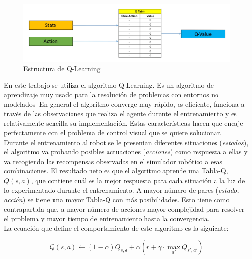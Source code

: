 \begin{figure}[!ht]
    \centering \includegraphics[width=0.8\columnwidth]{./figures/chapter_4/qlearning-dqn.png}
    \caption{Estructura de Q-Learning}\label{fig:qlearning-grafica}
\end{figure}


En este trabajo se utiliza el algoritmo Q-Learning. Es un algoritmo de aprendizaje muy usado para la resolución de problemas con entornos no modelados. En general el algoritmo converge muy rápido, es eficiente, funciona a través de las observaciones que realiza el agente durante el entrenamiento y es relativamente sencilla su implementación. Estas características hacen que encaje perfectamente con el problema de control visual que se quiere solucionar.\\

Durante el entrenamiento al robot se le presentan diferentes situaciones (\textit{estados}), el algoritmo va probando posibles actuaciones (\textit{acciones}) como respuesta a ellas y va recogiendo las recompensas observadas en el simulador robótico a esas combinaciones. El resultado neto es que el algoritmo aprende una Tabla-Q, $Q(s,a)$, que contiene cuál es la mejor respuesta para cada situación a la luz de lo experimentado durante el entrenamiento. A mayor número de pares (\textit{estado, acción}) se tiene una mayor Tabla-Q con más posibilidades. Esto tiene como contrapartida que, a mayor número de acciones mayor complejidad para resolver el problema y mayor tiempo de entrenamiento hasta la convergencia.\\

La ecuación que define el comportamiento de este algoritmo es la siguiente:

\begin{mycapequ}
   \begin{equation}
     Q(s,a) \leftarrow (1 - \alpha) Q_{s,a} + \alpha(r + \gamma \cdot \max_{a'}Q_{s',a'})
   \end{equation}
   \caption{Ecuación de Q-Learning}\label{ecuacion-qlearning}
\end{mycapequ}

